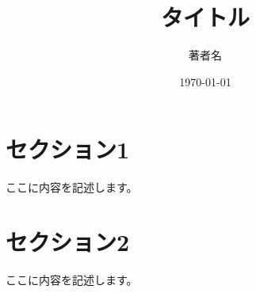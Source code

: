 \documentclass[12pt,a4paper,dvipdfmx]{jarticle}
\title{タイトル}
\author{著者名}
\date{\today}
\begin{document}
\maketitle

\section{セクション1}

ここに内容を記述します。

\section{セクション2}

ここに内容を記述します。
\end{document}
